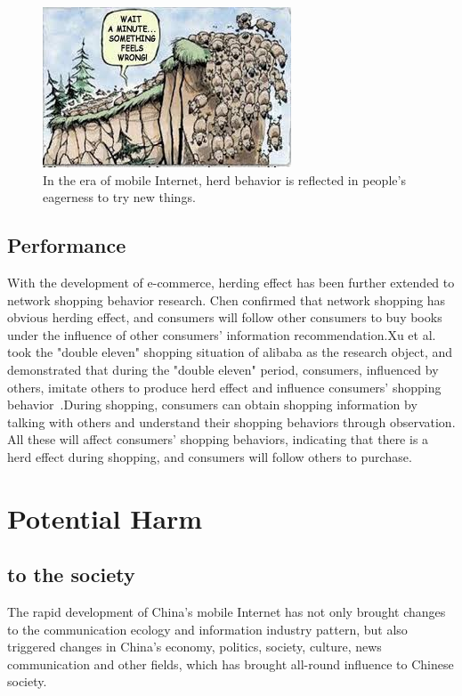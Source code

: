 \documentclass{elsarticle}
\begin{document}
\begin{figure}[ht!]
	\centering
	\includegraphics[trim=0in 0in 0in 0in,clip,width=0.75\columnwidth]{pics/herdeffect.jpg}
	\caption{In the era of mobile Internet, herd behavior is reflected in people's eagerness to try new things.\label{fig:herdeffect}}
\end{figure}


\subsection{Performance}

With the development of e-commerce, herding effect has been further extended to network shopping behavior research. Chen confirmed that network shopping has obvious herding effect, and consumers will follow other consumers to buy books under the influence of other consumers' information recommendation.Xu et al. took the "double eleven" shopping situation of alibaba as the research object, and demonstrated that during the "double eleven" period, consumers, influenced by others, imitate others to produce herd effect and influence consumers' shopping behavior~\cite{wgheyang}.During shopping, consumers can obtain shopping information by talking with others and understand their shopping behaviors through observation. All these will affect consumers' shopping behaviors, indicating that there is a herd effect during shopping, and consumers will follow others to purchase.


\section{Potential Harm}\label{sec:harm}

\subsection{to the society}
The rapid development of China's mobile Internet has not only brought changes to the communication ecology and information industry pattern, but also triggered changes in China's economy, politics, society, culture, news communication and other fields, which has brought all-round influence to Chinese society.
\end{document}

